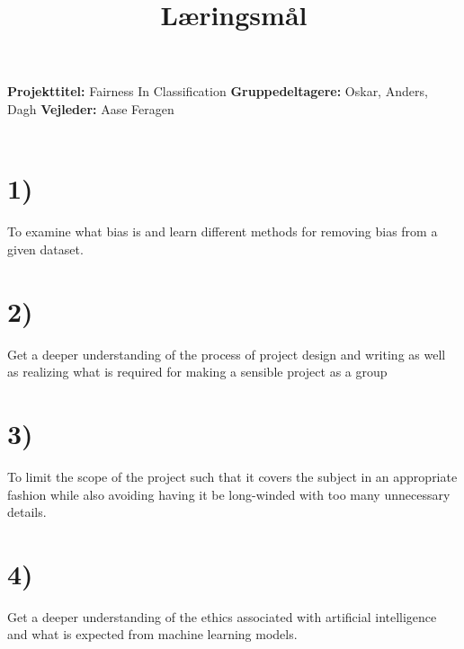 \documentclass[11pt, fleqn]{article}
\title{Læringsmål}
\date{}
\begin{document}
	\maketitle
	\noindent
	\vspace*{-1.4cm}
	\noindent
	\textbf{Projekttitel:} Fairness In Classification \newline \noindent
	\textbf{Gruppedeltagere:} Oskar, Anders, Dagh \newline  \noindent
	\textbf{Vejleder:} Aase Feragen \noindent
	\\\\
	\section*{1)}
	To examine what bias is and learn different methods for removing bias from a given dataset.
	\section*{2)}
	Get a deeper understanding of the process of project design and writing as well as realizing what is required for making a sensible project as a group
	
	\section*{3)}
	To limit the scope of the project such that it covers the subject in an appropriate fashion while also avoiding having it be long-winded with too many unnecessary details.
	
	\section*{4)}
	Get a deeper understanding of the ethics associated with artificial intelligence and what is expected from machine learning models.
	
\end{document}

